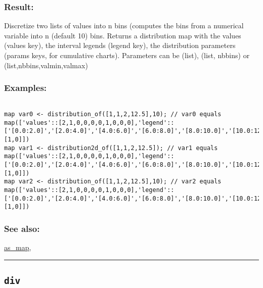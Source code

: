 \documentclass[]{book}
\theoremstyle{definition}
\theoremstyle{definition}
\theoremstyle{definition}
\theoremstyle{remark}
\begin{document}
\subsubsection{Result:}\label{result-135}

Discretize two lists of values into n bins (computes the bins from a
numerical variable into n (default 10) bins. Returns a distribution map
with the values (values key), the interval legends (legend key), the
distribution parameters (params keys, for cumulative charts). Parameters
can be (list), (list, nbbins) or (list,nbbins,valmin,valmax)

\subsubsection{Examples:}\label{examples-106}

\begin{verbatim}
 
map var0 <- distribution_of([1,1,2,12.5],10); // var0 equals map(['values'::[2,1,0,0,0,0,1,0,0,0],'legend'::['[0.0:2.0]','[2.0:4.0]','[4.0:6.0]','[6.0:8.0]','[8.0:10.0]','[10.0:12.0]','[12.0:14.0]','[14.0:16.0]','[16.0:18.0]','[18.0:20.0]'],'parlist'::[1,0]]) 
map var1 <- distribution2d_of([1,1,2,12.5]); // var1 equals map(['values'::[2,1,0,0,0,0,1,0,0,0],'legend'::['[0.0:2.0]','[2.0:4.0]','[4.0:6.0]','[6.0:8.0]','[8.0:10.0]','[10.0:12.0]','[12.0:14.0]','[14.0:16.0]','[16.0:18.0]','[18.0:20.0]'],'parlist'::[1,0]]) 
map var2 <- distribution_of([1,1,2,12.5],10); // var2 equals map(['values'::[2,1,0,0,0,0,1,0,0,0],'legend'::['[0.0:2.0]','[2.0:4.0]','[4.0:6.0]','[6.0:8.0]','[8.0:10.0]','[10.0:12.0]','[12.0:14.0]','[14.0:16.0]','[16.0:18.0]','[18.0:20.0]'],'parlist'::[1,0]])
\end{verbatim}

\subsubsection{See also:}\label{see-also-83}

\href{operators-a-to-a.html\#as_map}{as\_map},

\begin{center}\rule{0.5\linewidth}{\linethickness}\end{center}

\subsection{\texorpdfstring{\texttt{div}}{div}}\label{div}
\end{document}
